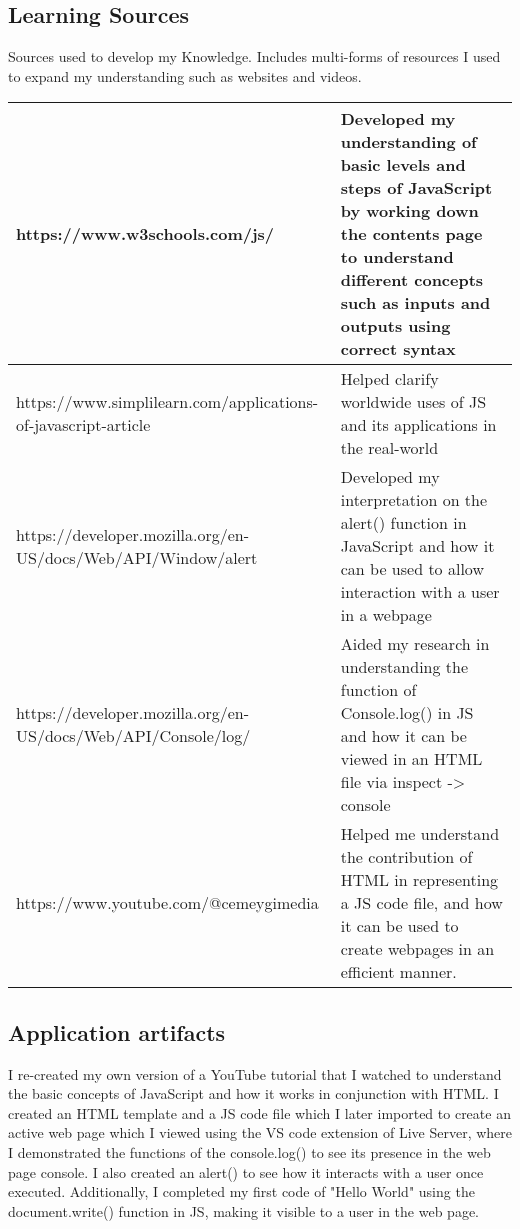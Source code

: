 \documentclass[a4paper, 11pt]{report}
\begin{document}
\subsection{Learning Sources}
Sources used to develop my Knowledge. Includes multi-forms of resources I used to expand my understanding such as websites and videos.

\begin{tabular}{|p{}|p{}|}
	\hline
	https://www.w3schools.com/js/ & Developed my understanding of basic levels and steps of JavaScript by working down the contents page to understand different concepts such as inputs and outputs using correct syntax  \\
	\hline
	https://www.simplilearn.com/applications-of-javascript-article & Helped clarify worldwide uses of JS and its applications in the real-world \\
	\hline
	https://developer.mozilla.org/en-US/docs/Web/API/Window/alert & Developed my interpretation on the alert() function in JavaScript and how it can be used to allow interaction with a user in a webpage\\
	\hline
	https://developer.mozilla.org/en-US/docs/Web/API/Console/log/ & Aided my research in understanding the function of Console.log() in JS and how it can be viewed in an HTML file via inspect -> console\\
	\hline
	https://www.youtube.com/@cemeygimedia & Helped me understand the contribution of HTML in representing a JS code file, and how it can be used to create webpages in an efficient manner.\\
	\hline
\end{tabular}

\cite{LevelA1}
\cite{LevelA2}
\cite{LevelA3}
\cite{LevelA4}
\cite{LevelA5}

\subsection{Application artifacts}
I re-created my own version of a YouTube tutorial that I watched to understand the basic concepts of JavaScript and how it works in conjunction with HTML. I created an HTML template and a JS code file which I later imported to create an active web page which I viewed using the VS code extension of Live Server, where I demonstrated the functions of the console.log() to see its presence in the web page console. I also created an alert() to see how it interacts with a user once executed. Additionally, I completed my first code of "Hello World" using the document.write() function in JS, making it visible to a user in the web page.   
\end{document}
